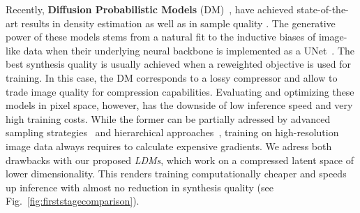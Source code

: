 \documentclass[10pt,twocolumn,letterpaper]{article}
\begin{document}
%
Recently, \textbf{Diffusion Probabilistic Models} (DM)~\cite{DBLP:journals/corr/Sohl-DicksteinW15}, have achieved state-of-the-art results in density estimation \cite{DBLP:journals/corr/abs-2107-00630} as well as in sample quality \cite{DBLP:journals/corr/abs-2105-05233}. The generative power of these models stems from a natural fit to the inductive biases of image-like data when their underlying neural backbone is implemented as a UNet~\cite{DBLP:conf/miccai/RonnebergerFB15, DBLP:conf/nips/HoJA20, DBLP:journals/corr/abs-2011-13456, DBLP:journals/corr/abs-2105-05233}.
%
The best synthesis quality is usually achieved when a reweighted objective \cite{DBLP:conf/nips/HoJA20}
is used for training. In this case, the DM corresponds to a lossy compressor and allow to trade image quality for compression capabilities.
Evaluating and optimizing these models in pixel space, however, has the downside of low inference speed and very high training costs.
While the former can be partially adressed by advanced sampling strategies~\cite{DBLP:conf/iclr/SongME21, DBLP:journals/corr/abs-2104-02600, DBLP:journals/corr/abs-2106-00132} and hierarchical approaches~\cite{DBLP:journals/corr/abs-2106-15282, DBLP:journals/corr/abs-2106-05931}, training on high-resolution image data always requires to calculate expensive gradients.
%
%
%
 We adress both drawbacks with our proposed \emph{LDMs}, which %
 work on a compressed latent space of lower dimensionality.
 This renders training computationally cheaper and speeds up inference with
 almost no reduction in synthesis quality (see
 Fig.~\ref{fig:firststagecomparison}).
%
%
%
%
%
%
\end{document}
